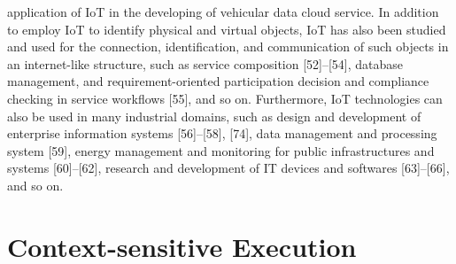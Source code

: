 application of IoT in the developing of vehicular data cloud
service. In addition to employ IoT to identify physical and
virtual objects, IoT has also been studied and used for the
connection, identification, and communication of such objects
in an internet-like structure, such as service composition
[52]–[54], database management, and requirement-oriented participation
decision and compliance checking in service workflows
[55], and so on.
Furthermore, IoT technologies can also be used in many
industrial domains, such as design and development of enterprise
information systems [56]–[58], [74], data management and
processing system [59], energy management and monitoring
for public infrastructures and systems [60]–[62], research and
development of IT devices and softwares [63]–[66], and so on.

\chapter{Context-sensitive Execution}  \label{conces}
